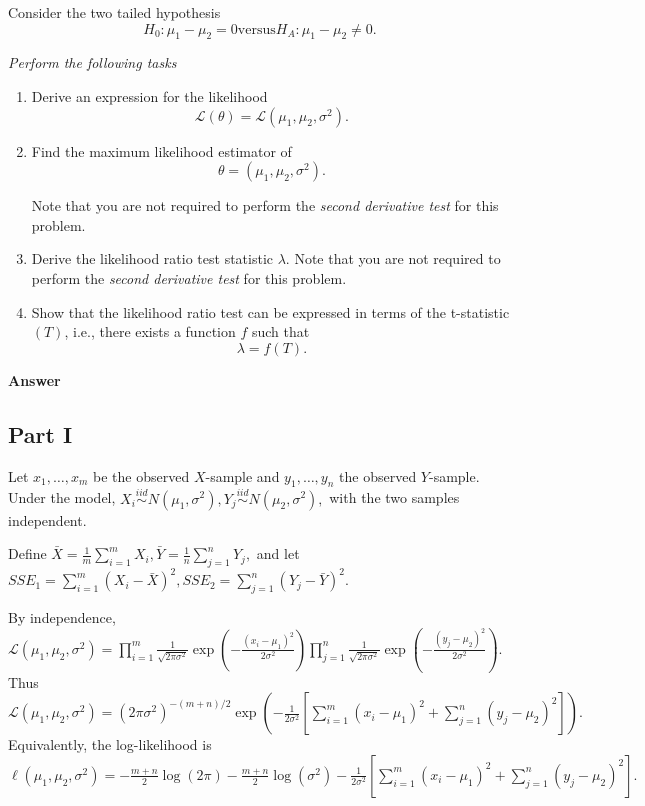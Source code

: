 \documentclass[letterpaper]{article}
\begin{document}
	\medskip
	
	Consider the two tailed hypothesis
	\[
	H_0 : \mu_1 - \mu_2 = 0 
	\text{versus} 
	H_A : \mu_1 - \mu_2 \neq 0 .
	\]
	
	\medskip
	
	\emph{Perform the following tasks}
	
	\begin{enumerate}
		
		\item[i] Derive an expression for the likelihood
		\[
		\mathcal{L}(\theta) = \mathcal{L}(\mu_1,\mu_2,\sigma^2).
		\]
		
		\item[ii] Find the maximum likelihood estimator of
		\[
		\theta = (\mu_1,\mu_2,\sigma^2).
		\]
		
		Note that you are not required to perform the \emph{second derivative test} for this problem.
		
		\item[iii] Derive the likelihood ratio test statistic $\lambda$. Note that you are not required to perform the \emph{second derivative test} for this problem.
		
		\item[iv] Show that the likelihood ratio test can be expressed in terms of the t-statistic $(T)$, i.e., there exists a function $f$ such that
		\[
		\lambda = f(T).
		\]
		
	\end{enumerate}
	
	\textbf{Answer}
	
	\subsection{Part I}
	
	Let $x_1,\dots,x_m$ be the observed $X$-sample and $y_1,\dots,y_n$ the observed $Y$-sample. Under the model,
	$
	X_i \stackrel{iid}{\sim} N(\mu_1,\sigma^2), 
	Y_j \stackrel{iid}{\sim} N(\mu_2,\sigma^2),
	$
	with the two samples independent.
	
	Define
	$
	\bar X=\frac1m\sum_{i=1}^m X_i, 
	\bar Y=\frac1n\sum_{j=1}^n Y_j,
	$
	and let
	$
	SSE_1=\sum_{i=1}^m (X_i-\bar X)^2, 
	SSE_2=\sum_{j=1}^n (Y_j-\bar Y)^2.
	$
	
	
	By independence,
	$
	\mathcal L(\mu_1,\mu_2,\sigma^2)
	=
	\prod_{i=1}^m \frac{1}{\sqrt{2\pi\sigma^2}}
	\exp\!\left(-\frac{(x_i-\mu_1)^2}{2\sigma^2}\right)
	\prod_{j=1}^n \frac{1}{\sqrt{2\pi\sigma^2}}
	\exp\!\left(-\frac{(y_j-\mu_2)^2}{2\sigma^2}\right).
	$
	Thus
	$
	\mathcal L(\mu_1,\mu_2,\sigma^2)
	=
	(2\pi\sigma^2)^{-(m+n)/2}
	\exp\!\left(
	-\frac{1}{2\sigma^2}
	\left[
	\sum_{i=1}^m (x_i-\mu_1)^2+\sum_{j=1}^n (y_j-\mu_2)^2
	\right]
	\right).
	$
	Equivalently, the log-likelihood is
	$
	\ell(\mu_1,\mu_2,\sigma^2)
	=
	-\frac{m+n}{2}\log(2\pi)
	-\frac{m+n}{2}\log(\sigma^2)
	-\frac{1}{2\sigma^2}
	\left[
	\sum_{i=1}^m (x_i-\mu_1)^2+\sum_{j=1}^n (y_j-\mu_2)^2
	\right].
	$
	
\end{document}
